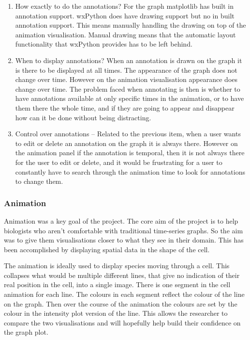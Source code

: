 \begin{enumerate}
\item How exactly to do the annotations?  For the graph matplotlib has built in annotation support.  wxPython does have drawing support but no in built annotation support.  This means manually handling the drawing on top of the animation visualisation.  Manual drawing means that the automatic layout functionality that wxPython provides has to be left behind.
\item When to display annotations?  When an annotation is drawn on the graph it is there to be displayed at all times.  The appearance of the graph does not change over time.  However on the animation visualisation appearance does change over time.  The problem faced when annotating is then is whether to have annotations available at only specific times in the animation, or to have them there the whole time, and if they are going to appear and disappear how can it be done without being distracting.
\item Control over annotations -- Related to the previous item, when a user wants to edit or delete an annotation on the graph it is always there.  However on the animation panel if the annotation is temporal, then it is not always there for the user to edit or delete, and it would be frustrating for a user to constantly have to search through the animation time to look for annotations to change them.
\end{enumerate}

\subsubsection{Animation}

Animation was a key goal of the project.  The core aim of the project is to help biologists who aren't comfortable with traditional time-series graphs.  So the aim was to give them visualisations closer to what they see in their domain.  This has been accomplished by displaying spatial data in the shape of the cell.

The animation is ideally used to display species moving through a cell.  This collapses what would be multiple different lines, that give no indication of their real position in the cell, into a single image.  There is one segment in the cell animation for each line.  The colours in each segment reflect the colour of the line on the graph.  Then over the course of the animation the colours are set by the colour in the intensity plot version of the line.  This allows the researcher to compare the two visualisations and will hopefully help build their confidence on the graph plot.

